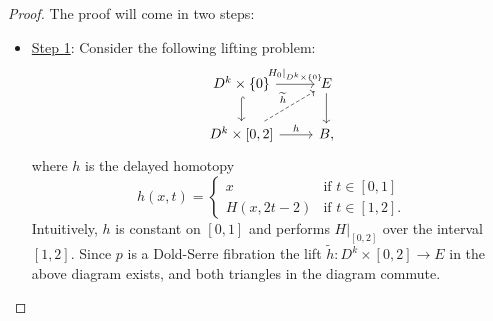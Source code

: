 \documentclass{article}
\newtheorem{proposed work}[theorem]{Proposed Work}
\begin{document}
\begin{proof}
The proof will come in two steps:

\begin{itemize}
\item \underline{Step 1}: Consider the following lifting problem:
\begin{equation*}
\begin{tikzcd}
D^k \times \{0\} \arrow[r, "H_0|_{D^k \times \{0\}}"] \arrow[d,hookrightarrow] & E \arrow[d] \\
D^k \times [0,2] \arrow[r,"h"] \arrow[ur,"\widetilde{h}", dashed] & B,
\end{tikzcd}
\end{equation*}
where $h$ is the delayed homotopy
\begin{equation*}
h(x,t) = \begin{cases} x & \text{if } t \in [0,1] \\ H(x,2t-2) & \text{if } t \in [1,2]. \end{cases}
\end{equation*}
Intuitively, $h$ is constant on $[0,1]$ and performs $H|_{[0,2]}$ over the interval $[1,2]$. Since $p$ is a Dold-Serre fibration the lift $\widetilde{h}: D^k \times [0,2] \to E$ in the above diagram exists, and both triangles in the diagram commute.


\end{itemize}
\end{proof}
\end{document}
